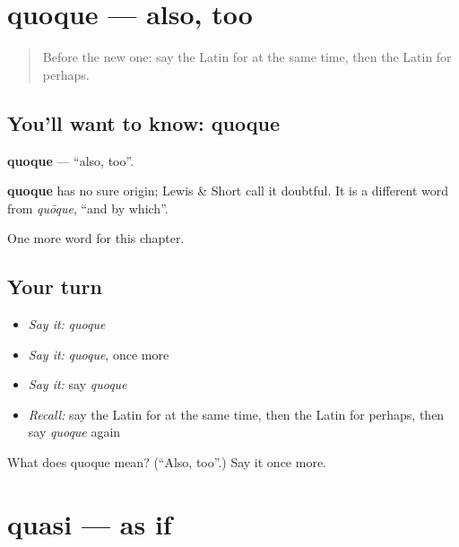\section[quoque]{quoque — also, too}

\label{lesson:LA-C239-quoque}



\begin{quote}
Before the new one: say the Latin for at the same time, then the Latin for perhaps.
\end{quote}

\subsection*{You'll want to know: quoque}
\textbf{quoque} — \textquotedblleft{}also, too\textquotedblright{}.

\begin{cousinweb}
\textbf{quoque} has no sure origin; Lewis \& Short call it doubtful. It is a different word from \emph{quōque}, \textquotedblleft{}and by which\textquotedblright{}.
\end{cousinweb}

\begin{grammarlens}[title={What you've built}]
One more word for this chapter.
\end{grammarlens}

\subsection*{Your turn}
\begin{itemize}
\raggedright
  \item \emph{Say it:} \emph{quoque}
  \item \emph{Say it:} \emph{quoque}, once more
  \item \emph{Say it:} say \emph{quoque}
  \item \emph{Recall:} say the Latin for at the same time, then the Latin for perhaps, then say \emph{quoque} again
\end{itemize}

\begin{tcolorbox}[breakable,colback=teal!4,colframe=teal!35!black,title={Before you move on}]
What does quoque mean? (\textquotedblleft{}Also, too\textquotedblright{}.) Say it once more.
\end{tcolorbox}
\section[quasi]{quasi — as if}

